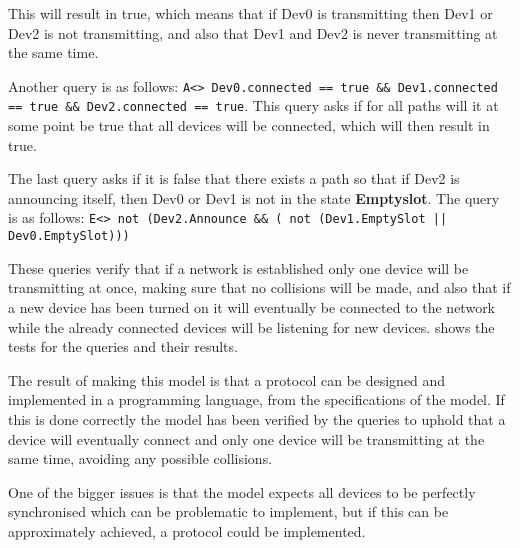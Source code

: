 This will result in true, which means that if Dev0 is transmitting then Dev1 or Dev2 is not transmitting, and also that Dev1 and Dev2 is never transmitting at the same time.

Another query is as follows: \texttt{A<> Dev0.connected == true \&\& Dev1.connected == true \&\& Dev2.connected == true}.
This query asks if for all paths will it at some point be true that all devices will be connected, which will then result in true.

The last query asks if it is false that there exists a path so that if Dev2 is announcing itself, then Dev0 or Dev1 is not in the state \textbf{Emptyslot}.
The query is as follows: \texttt{E<> not (Dev2.Announce \&\& ( not (Dev1.EmptySlot || Dev0.EmptySlot)))}

These queries verify that if a network is established only one device will be transmitting at once, making sure that no collisions will be made, and also that if a new device has been turned on it will eventually be connected to the network while the already connected devices will be listening for new devices.
 shows the tests for the queries and their results.

\bigskip

The result of making this model is that a protocol can be designed and implemented in a programming language, from the specifications of the model.
If this is done correctly the model has been verified by the queries to uphold that a device will eventually connect and only one device will be transmitting at the same time, avoiding any possible collisions.

One of the bigger issues is that the model expects all devices to be perfectly synchronised which can be problematic to implement, but if this can be approximately achieved, a protocol could be implemented.




